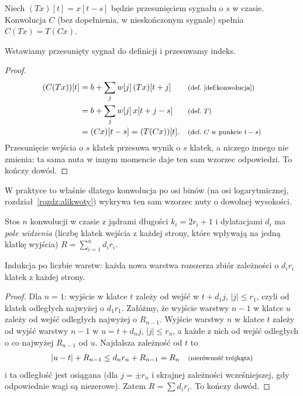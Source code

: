 \begin{twierdzenie}\label{tw:rownowaznosc}
Niech $(Tx)[t]=x[t-s]$ będzie przesunięciem sygnału o $s$ w czasie. Konwolucja $C$ (bez dopełnienia, w nieskończonym sygnale) spełnia $C(Tx)=T(Cx)$.
\end{twierdzenie}
\begin{pomyslDowodu}
Wstawiamy przesunięty sygnał do definicji i przesuwamy indeks.
\end{pomyslDowodu}
\begin{proof}
\begin{align*}
(C(Tx))[t] &= b+\sum_j w[j]\,(Tx)[t+j] && \text{\footnotesize (def.~\ref{def:konwolucja})}\\
 &= b+\sum_j w[j]\,x[t+j-s] && \text{\footnotesize (def.\ $T$)}\\
 &= (Cx)[t-s]=(T(Cx))[t]. && \text{\footnotesize (def.\ $C$ w punkcie $t-s$)}
\end{align*}
Przesunięcie wejścia o $s$ klatek przesuwa wynik o $s$ klatek, a niczego innego nie zmienia: ta sama nuta w innym momencie daje ten sam wzorzec odpowiedzi. To kończy dowód.
\end{proof}

W praktyce to właśnie dlatego konwolucja po osi binów (na osi logarytmicznej, rozdział~\ref{rozdz:alikwoty}) wykrywa ten sam wzorzec nuty o dowolnej wysokości.

\begin{twierdzenie}\label{tw:pole-widzenia}
Stos $n$ konwolucji w czasie z jądrami długości $k_i=2r_i+1$ i dylatacjami $d_i$ ma \emph{pole widzenia} (liczbę klatek wejścia z każdej strony, które wpływają na jedną klatkę wyjścia)
$R=\sum_{i=1}^{n}d_ir_i$.
\end{twierdzenie}
\begin{pomyslDowodu}
Indukcja po liczbie warstw: każda nowa warstwa rozszerza zbiór zależności o $d_ir_i$ klatek z każdej strony.
\end{pomyslDowodu}
\begin{proof}
Dla $n=1$: wyjście w klatce $t$ zależy od wejść w $t+d_1j$, $|j|\le r_1$, czyli od klatek odległych najwyżej o $d_1r_1$. Załóżmy, że wyjście warstwy $n-1$ w klatce $u$ zależy od wejść odległych najwyżej o $R_{n-1}$.
Wyjście warstwy $n$ w klatce $t$ zależy od wyjść warstwy $n-1$ w $u=t+d_nj$, $|j|\le r_n$, a każde z nich od wejść odległych o co najwyżej $R_{n-1}$ od $u$. Najdalsza zależność od $t$ to
\begin{align*}
|u-t|+R_{n-1}\le d_nr_n+R_{n-1}=R_n && \text{\footnotesize (nierówność trójkąta)}
\end{align*}
i ta odległość jest osiągana (dla $j=\pm r_n$ i skrajnej zależności wcześniejszej, gdy odpowiednie wagi są niezerowe). Zatem $R=\sum d_ir_i$. To kończy dowód.
\end{proof}

